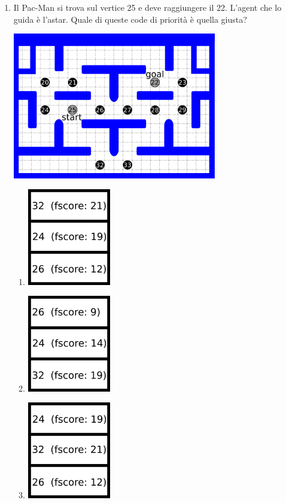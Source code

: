 \documentclass[8pt]{book}
\begin{document}
\begin{enumerate}
\item Il Pac-Man si trova sul vertice 25 e deve raggiungere il 22. L'agent che lo guida è l'astar. Quale di queste code di priorità è quella giusta?

\includegraphics[width=0.70000\textwidth]{img/astar_coda_es.png}\\[2\baselineskip]

\begin{enumerate}
\def\labelenumi{\alph{enumi}.}
\item
  \includegraphics[width=0.30000\textwidth]{img/astar_coda_es_sol1.png}
\item
  \includegraphics[width=0.30000\textwidth]{img/astar_coda_es_sol2.png}
\item
  \includegraphics[width=0.30000\textwidth]{img/astar_coda_es_sol3.png}
\end{enumerate}


\end{enumerate}
\end{document}
